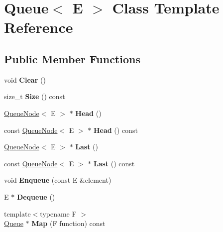 \hypertarget{class_queue}{}\section{Queue$<$ E $>$ Class Template Reference}
\label{class_queue}
\subsection*{Public Member Functions}
\begin{DoxyCompactItemize}
\item 
\mbox{\label{class_queue_acfdd5f9f7e936ca30dcf877370ef9510}} 
void {\bfseries Clear} ()
\item 
\mbox{\label{class_queue_abc4d78b5f66041011c5590bf703847b0}} 
size\+\_\+t {\bfseries Size} () const
\item 
\mbox{\label{class_queue_a71aa0154ef75bb87a53b6af1829fcd5e}} 
\mbox{\hyperlink{class_queue_node}{Queue\+Node}}$<$ E $>$ $\ast$ {\bfseries Head} ()
\item 
\mbox{\label{class_queue_a6c906075e0ad2d1f0634990aa106395e}} 
const \mbox{\hyperlink{class_queue_node}{Queue\+Node}}$<$ E $>$ $\ast$ {\bfseries Head} () const
\item 
\mbox{\label{class_queue_a430aca3d3b9f5fd588b215028d134b74}} 
\mbox{\hyperlink{class_queue_node}{Queue\+Node}}$<$ E $>$ $\ast$ {\bfseries Last} ()
\item 
\mbox{\label{class_queue_a7c8c2c64700dfe1df8bf266572cf101a}} 
const \mbox{\hyperlink{class_queue_node}{Queue\+Node}}$<$ E $>$ $\ast$ {\bfseries Last} () const
\item 
\mbox{\label{class_queue_abaa2e7175457307bca74f5562cbdaaa9}} 
void {\bfseries Enqueue} (const E \&element)
\item 
\mbox{\label{class_queue_a434d465001c3078e999f7a89a8af84c0}} 
E $\ast$ {\bfseries Dequeue} ()
\item 
\mbox{\label{class_queue_a904a696292fc593adc6fd21fb229d760}} 
{\footnotesize template$<$typename F $>$ }\\\mbox{\hyperlink{class_queue}{Queue}} $\ast$ {\bfseries Map} (F function) const
\end{DoxyCompactItemize}
